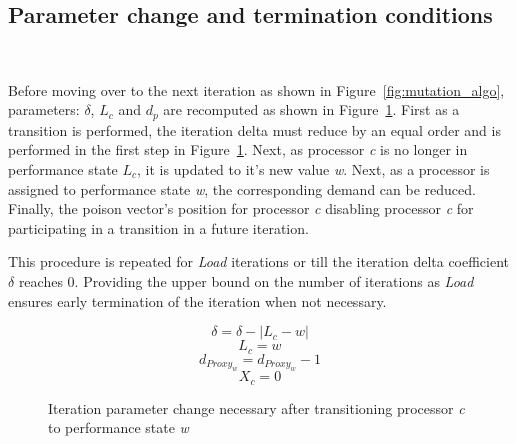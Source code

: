 \subsection{Parameter change and termination conditions}~\label{sec:param_adjust}

Before moving over to the next iteration as shown in Figure~\ref{fig:mutation_algo},
parameters: $\delta$, $L_c$ and $d_p$ are recomputed
as shown in Figure~\ref{fig:adjust}. First as a transition is performed, the iteration delta
must reduce by an equal order and is performed in the first step in Figure~\ref{fig:adjust}.
Next, as processor \textit{c} is no longer in performance state $L_c$, it is updated to
it's new value \textit{w}. Next, as a processor is assigned to performance state \textit{w},
the corresponding demand can be reduced. Finally, the poison vector's position for processor
\textit{c} disabling processor \textit{c} for participating in a transition in a future 
iteration.

This procedure is repeated for \textit{Load} iterations or till the iteration delta coefficient 
$\delta$ reaches 0. Providing the upper bound on the number of iterations as \textit{Load} 
ensures early termination of the iteration when not necessary. 


\begin{figure}[h!]
\centering
\begin{equation*}
    \delta = \delta - |L_{c} - w| 
\end{equation*}
\begin{equation*}
    L_{c} = w 
\end{equation*}
\begin{equation*}
    d_{Proxy_w} = d_{Proxy_w} - 1 
\end{equation*}
\begin{equation*}
    X_c = 0
\end{equation*}
\caption{Iteration parameter change necessary after transitioning processor \textit{c} to performance state \textit{w}}
\label{fig:adjust}
\end{figure}

